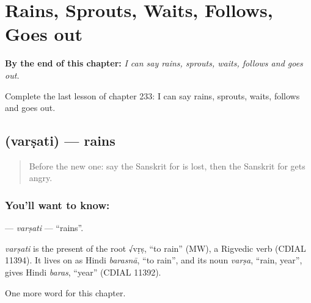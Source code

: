 
\chapter{Rains, Sprouts, Waits, Follows, Goes out}
\label{ch:sa-rains-sprouts-waits-follows-goes-out}

\begin{chapteropening}
\textbf{By the end of this chapter:} \emph{I can say rains, sprouts, waits, follows and goes out.}

Complete the last lesson of chapter 233: I can say rains, sprouts, waits, follows and goes out.
\end{chapteropening}

\section[\texorpdfstring{\sk{वर्षति} (varṣati)}{वर्षति (varṣati)}]{ (varṣati) — rains}

\label{lesson:SA-C233-varsati}



\begin{quote}
Before the new one: say the Sanskrit for is lost, then the Sanskrit for gets angry.
\end{quote}

\subsection*{You'll want to know: }
\textbf{} — \emph{varṣati} — \textquotedblleft{}rains\textquotedblright{}.

\begin{cousinweb}
\emph{varṣati} is the present of the root √vṛṣ, \textquotedblleft{}to rain\textquotedblright{} (MW), a Rigvedic verb (CDIAL 11394). It lives on as Hindi \emph{barasnā}, \textquotedblleft{}to rain\textquotedblright{}, and its noun \emph{varṣa}, \textquotedblleft{}rain, year\textquotedblright{}, gives Hindi \emph{baras}, \textquotedblleft{}year\textquotedblright{} (CDIAL 11392).
\end{cousinweb}

\begin{grammarlens}[title={What you've built}]
One more word for this chapter.
\end{grammarlens}

